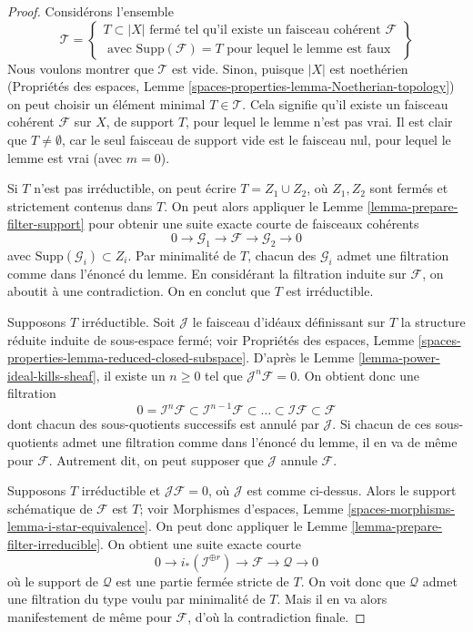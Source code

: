 \begin{proof}
Considérons l'ensemble
$$
\mathcal{T} =
\left\{
\begin{matrix}
T \subset |X|
\text{ fermé tel qu'il existe un faisceau cohérent }
\mathcal{F} \\
\text{ avec }
\text{Supp}(\mathcal{F}) = T
\text{ pour lequel le lemme est faux}
\end{matrix}
\right\}
$$
Nous voulons montrer que $\mathcal{T}$ est vide. Sinon,
puisque $|X|$ est noethérien (Propriétés des espaces, Lemme
\ref{spaces-properties-lemma-Noetherian-topology})
on peut choisir un élément minimal $T \in \mathcal{T}$. Cela signifie qu'il
existe un faisceau cohérent $\mathcal{F}$ sur $X$, de support $T$,
pour lequel le lemme n'est pas vrai. Il est clair que $T \not = \emptyset$, car
le seul faisceau de support vide est le faisceau nul, pour lequel le
lemme est vrai (avec $m = 0$).

\medskip\noindent
Si $T$ n'est pas irréductible, on peut écrire $T = Z_1 \cup Z_2$,
où $Z_1, Z_2$ sont fermés et strictement contenus dans $T$.
On peut alors appliquer le Lemme \ref{lemma-prepare-filter-support}
pour obtenir une suite exacte courte de faisceaux cohérents
$$
0 \to
\mathcal{G}_1 \to
\mathcal{F} \to
\mathcal{G}_2 \to 0
$$
avec $\text{Supp}(\mathcal{G}_i) \subset Z_i$. Par minimalité de
$T$, chacun des $\mathcal{G}_i$ admet une filtration comme dans l'énoncé
du lemme. En considérant la filtration induite sur $\mathcal{F}$,
on aboutit à une contradiction. On en conclut
que $T$ est irréductible.

\medskip\noindent
Supposons $T$ irréductible. Soit $\mathcal{J}$ le faisceau d'idéaux
définissant sur $T$ la structure réduite induite de sous-espace fermé;
voir Propriétés des espaces, Lemme
\ref{spaces-properties-lemma-reduced-closed-subspace}.
D'après le Lemme \ref{lemma-power-ideal-kills-sheaf}, il existe
un $n \geq 0$ tel que $\mathcal{J}^n\mathcal{F} = 0$. On obtient donc
une filtration
$$
0 = \mathcal{I}^n\mathcal{F} \subset \mathcal{I}^{n - 1}\mathcal{F}
\subset \ldots \subset \mathcal{I}\mathcal{F} \subset \mathcal{F}
$$
dont chacun des sous-quotients successifs est annulé par $\mathcal{J}$.
Si chacun de ces sous-quotients admet une filtration comme dans l'énoncé
du lemme, il en va de même pour $\mathcal{F}$. Autrement dit, on peut
supposer que $\mathcal{J}$ annule $\mathcal{F}$.

\medskip\noindent
Supposons $T$ irréductible et $\mathcal{J}\mathcal{F} = 0$, où
$\mathcal{J}$ est comme ci-dessus. Alors le support schématique de
$\mathcal{F}$ est $T$; voir
Morphismes d'espaces, Lemme \ref{spaces-morphisms-lemma-i-star-equivalence}.
On peut donc appliquer le Lemme \ref{lemma-prepare-filter-irreducible}.
On obtient une suite exacte courte
$$
0 \to
i_*(\mathcal{I}^{\oplus r}) \to
\mathcal{F} \to
\mathcal{Q} \to 0
$$
où le support de $\mathcal{Q}$ est une partie fermée stricte de $T$.
On voit donc que $\mathcal{Q}$ admet une filtration du type voulu
par minimalité de $T$. Mais il en va alors manifestement de même pour $\mathcal{F}$,
d'où la contradiction finale.
\end{proof}

